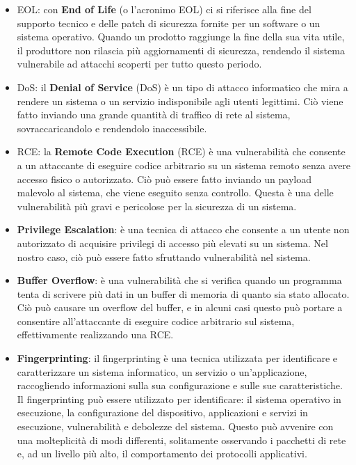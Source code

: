 \begin{itemize}
    \item EOL: con \textbf{End of Life} (o l'acronimo EOL) ci si riferisce alla fine del supporto tecnico e delle patch di sicurezza fornite per un software o un sistema operativo. Quando un prodotto raggiunge la fine della sua vita utile, il produttore non rilascia più aggiornamenti di sicurezza, rendendo il sistema vulnerabile ad attacchi scoperti per tutto questo periodo.
    \item DoS: il \textbf{Denial of Service} (DoS) è un tipo di attacco informatico che mira a rendere un sistema o un servizio indisponibile agli utenti legittimi. Ciò viene fatto inviando una grande quantità di traffico di rete al sistema, sovraccaricandolo e rendendolo inaccessibile.
    \item RCE: la \textbf{Remote Code Execution} (RCE) è una vulnerabilità che consente a un attaccante di eseguire codice arbitrario su un sistema remoto senza avere accesso fisico o autorizzato. Ciò può essere fatto inviando un payload malevolo al sistema, che viene eseguito senza controllo. Questa è una delle vulnerabilità più gravi e pericolose per la sicurezza di un sistema.
    \item \textbf{Privilege Escalation}: è una tecnica di attacco che consente a un utente non autorizzato di acquisire privilegi di accesso più elevati su un sistema. Nel nostro caso, ciò può essere fatto sfruttando vulnerabilità nel sistema.
    \item \textbf{Buffer Overflow}: è una vulnerabilità che si verifica quando un programma tenta di scrivere più dati in un buffer di memoria di quanto sia stato allocato. Ciò può causare un overflow del buffer, e in alcuni casi questo può portare a consentire all'attaccante di eseguire codice arbitrario sul sistema, effettivamente realizzando una RCE.
    \item \textbf{Fingerprinting}: il fingerprinting è una tecnica utilizzata per identificare e caratterizzare un sistema informatico, un servizio o un'applicazione, raccogliendo informazioni sulla sua configurazione e sulle sue caratteristiche. Il fingerprinting può essere utilizzato per identificare: il sistema operativo in esecuzione, la configurazione del dispositivo, applicazioni e servizi in esecuzione, vulnerabilità e debolezze del sistema. Questo può avvenire con una molteplicità di modi differenti, solitamente osservando i pacchetti di rete e, ad un livello più alto, il comportamento dei protocolli applicativi.
\end{itemize}